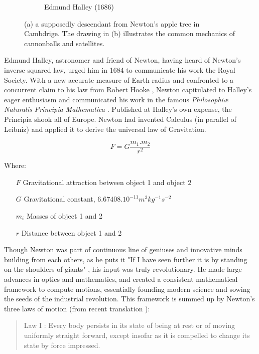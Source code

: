 \begin{figure}
\begin{subfigure}[b]{0.35\textwidth}
        \caption{Edmund Halley (1686)}
        \label{Fig:0_newton_4}
    \end{subfigure}
\caption[Newton's tree, cannon drawing, Newton and Halley]{(a) a supposedly descendant from Newton's apple tree in Cambdrige. The drawing in (b) illustrates the common mechanics of cannonballs and satellites.}
\label{Fig:0_newton}
\end{figure}


Edmund Halley, astronomer and friend of Newton, having heard of Newton's inverse squared law, urged him in 1684 to communicate his work the Royal Society. With a new accurate measure of Earth radius and confronted to a concurrent claim to his law from Robert Hooke \citep{Kramer1982}, Newton capitulated to Halley's eager enthusiasm and communicated his work in the famous \textit{Philosophiæ Naturalis Principia Mathematica} \citep{Newton1687}. Published at Halley's own expense, the Principia shook all of Europe. Newton had invented Calculus (in parallel of Leibniz) and applied it to derive the universal law of Gravitation.

\begin{equation}
F = G \frac{m_1.m_2}{r^2}
\end{equation}


Where:
\begin{itemize}
 \setlength\itemsep{-0.5em}
  \item[$F$] Gravitational attraction between object 1 and object 2
\item[$G$] Gravitational constant, $6.67408.10^{-11} m^3 kg^{-1} s^{-2}$ \citep{Mohr2012}
\item[$m_i$] Masses of object 1 and 2
\item[$r$] Distance between object 1 and 2
\end{itemize}

Though Newton was part of continuous line of geniuses and innovative minds building from each others, as he puts it "If I have seen further it is by standing on the shoulders of giants" \citep{Maury1992}, his input was truly revolutionary. He made large advances in optics and mathematics, and created a consistent mathematical framework to compute motions, essentially founding modern science and sowing the seeds of the industrial revolution. This framework is summed up by Newton's three laws of motion (from recent translation \citealt{Cohen1999}):

\begin{quote}
Law I : Every body persists in its state of being at rest or of moving uniformly straight forward, except insofar as it is compelled to change its state by force impressed.
\end{quote}

